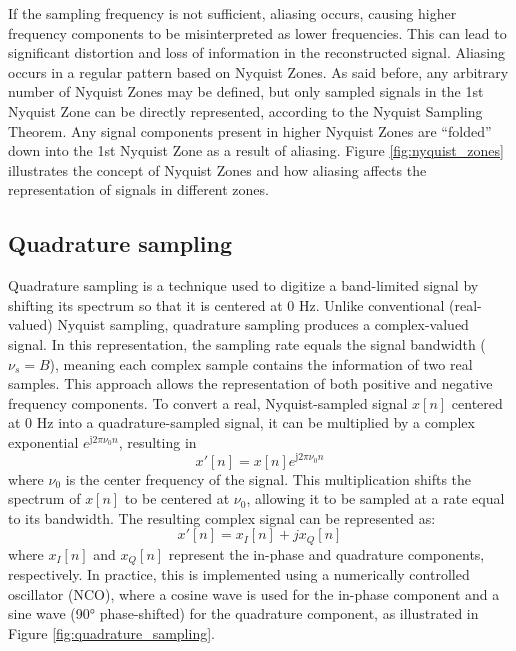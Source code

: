 If the sampling frequency is not sufficient, aliasing occurs, causing higher frequency components to be misinterpreted as lower frequencies. This can lead to significant distortion and loss of information in the reconstructed signal. Aliasing occurs in a regular pattern based on Nyquist Zones. As said before, any arbitrary number of Nyquist Zones may be defined, but only sampled signals in the 1st Nyquist Zone can be directly represented, according to the Nyquist Sampling Theorem. Any signal components present in higher Nyquist Zones are ``folded'' down into the 1st Nyquist Zone as a result of aliasing. Figure \ref{fig:nyquist_zones} illustrates the concept of Nyquist Zones and how aliasing affects the representation of signals in different zones.


\subsection{Quadrature sampling}
\label{sec:quadrature_sampling}
Quadrature sampling is a technique used to digitize a band-limited signal by shifting its spectrum so that it is centered at 0 Hz. Unlike conventional (real-valued) Nyquist sampling, quadrature sampling produces a complex-valued signal. In this representation, the sampling rate equals the signal bandwidth ($\nu_s = B$), meaning each complex sample contains the information of two real samples. This approach allows the representation of both positive and negative frequency components. To convert a real, Nyquist-sampled signal $x[n]$ centered at 0 Hz into a quadrature-sampled signal, it can be multiplied by a complex exponential $e^{\mathrm{j}2\pi \nu_0 n}$, resulting in
\begin{equation}
	\label{eq:quadrature_sampling}
	x'[n] = x[n] e^{\mathrm{j}2\pi \nu_0 n}
\end{equation}
where $\nu_0$ is the center frequency of the signal. This multiplication shifts the spectrum of $x[n]$ to be centered at $\nu_0$, allowing it to be sampled at a rate equal to its bandwidth. The resulting complex signal can be represented as:
\begin{equation}
	x'[n] = x_I[n] + j x_Q[n]
	\label{eq:complex_signal}
\end{equation}
where $x_I[n]$ and $x_Q[n]$ represent the in-phase and quadrature components, respectively. In practice, this is implemented using a numerically controlled oscillator (NCO), where a cosine wave is used for the in-phase component and a sine wave (90° phase-shifted) for the quadrature component, as illustrated in Figure \ref{fig:quadrature_sampling}.
